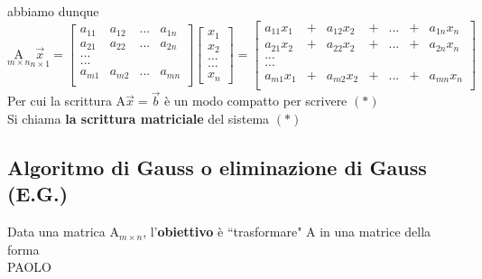 
abbiamo dunque\\

$\underset{m\times n}{\textrm{A}} \underset{n\times 1}{\vec{x}}=
\begin{bmatrix}
    a_{11} & a_{12} & ... & a_{1n}\\
    a_{21} & a_{22} & ... & a_{2n}\\
    ...\\
    ...\\
    a_{m1} & a_{m2} & ... & a_{mn}\\
\end{bmatrix}
\begin{bmatrix}
    x_1\\
    x_2\\
    ...\\
    ...\\
    x_n
\end{bmatrix}
=
\begin{bmatrix}
    a_{11}x_1 &+& a_{12}x_2 & + & ...& +& a_{1n}x_n\\
    a_{21}x_2 &+& a_{22}x_2 & + & ...& +& a_{2n}x_n\\
    ...\\
    ...\\
    a_{m1}x_1 &+& a_{m2}x_2 & + & ...& +& a_{mn}x_n\\
\end{bmatrix}
$\\

Per cui la scrittura A$\vec{x}=\vec{b}$ è un modo compatto per scrivere $(*)$\\
Si chiama \textbf{la scrittura matriciale} del sistema $(*)$

\subsection{Algoritmo di Gauss o eliminazione di Gauss (E.G.)}
Data una matrica A$_{m\times n}$, l'\textbf{obiettivo} è ``trasformare" A in una matrice della forma\\
{\color{purple} PAOLO}\\ %
